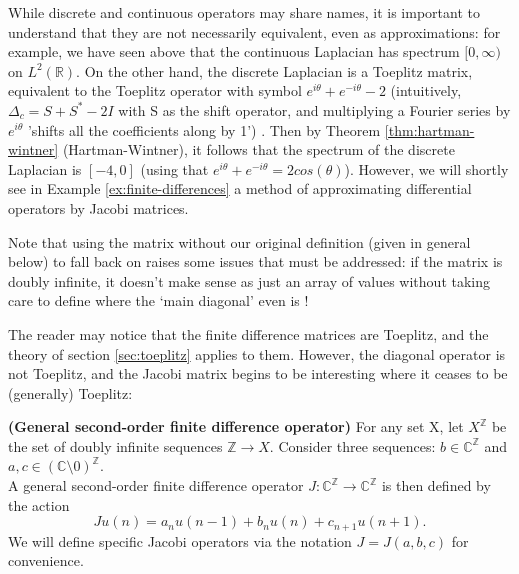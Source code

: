\documentclass[../main.tex]{subfiles}
\begin{document}
\begin{remark}
  While discrete and continuous operators may share names, it is important to
  understand that they are not necessarily equivalent, even as approximations:
  for example, we have seen above that the continuous Laplacian has spectrum
  $[0, \infty)$ on $L^2(\mathbb{R})$. On the other hand, the discrete Laplacian
  is a Toeplitz matrix, equivalent to the Toeplitz operator with symbol 
  $e^{i \theta} + e^{-i \theta} - 2$ (intuitively, $\Delta_c = S + S^* - 2I$ with S as the
  shift operator, and multiplying a Fourier series by $e^{i \theta}$
  'shifts all the coefficients along by 1') \cite{arveson2002short}.
  Then by Theorem \ref{thm:hartman-wintner}
  (Hartman-Wintner), it follows that the spectrum of the discrete Laplacian is
  $[-4, 0]$ (using that $e^{i \theta} + e^{-i \theta} = 2cos(\theta)$).
  However, we will shortly see in Example \ref{ex:finite-differences} a method
  of approximating differential operators by Jacobi matrices.
\end{remark}

Note that using the matrix without our original definition (given in general
below) to fall back on raises some issues that must be addressed: if the matrix
is doubly infinite, it doesn't make sense as just an array of values without
taking care to define where the `main diagonal' even is \cite{lindner2013where}!

The reader may notice that the finite difference matrices are Toeplitz, and the
theory of section \ref{sec:toeplitz} applies to them. However, the diagonal
operator is not Toeplitz, and the Jacobi matrix begins to be interesting where
it ceases to be (generally) Toeplitz:

\begin{definition}{\textbf{(General second-order finite difference operator)}}
  For any set X, let $X^\mathbb{Z}$ be the set of doubly infinite sequences $\mathbb{Z}
  \rightarrow X$. Consider three sequences:
  $b \in \mathbb{C}^\mathbb{Z}$
  and $a, c \in (\mathbb{C} \setminus 0)^\mathbb{Z}$.\\
  A general second-order finite difference operator 
  $J: \mathbb{C}^\mathbb{Z} \rightarrow \mathbb{C}^\mathbb{Z}$
  is then defined by the action 
  \begin{equation}
  \label{eqn:2efde}
    Ju (n) = a_n u(n-1) + b_n u(n) + c_{n+1} u(n+1).
  \end{equation}
  We will define specific Jacobi operators via the notation $J = J(a, b, c)$
  for convenience.
\end{definition}
\end{document}
